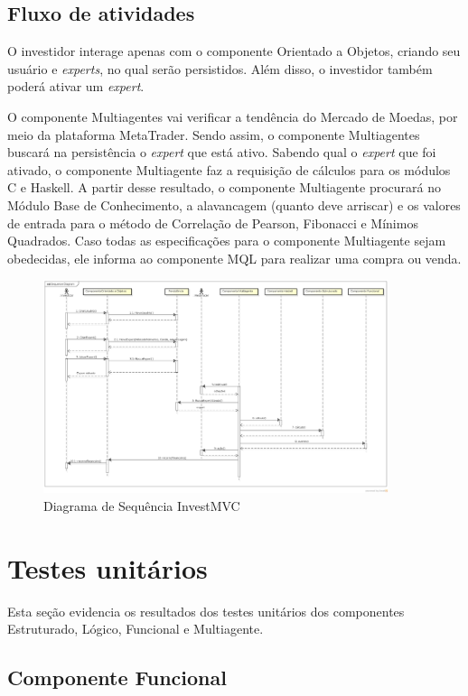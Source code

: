 \subsection{Fluxo de atividades}
O investidor interage apenas com o componente Orientado a Objetos, criando seu usuário e \textit{experts}, no qual serão persistidos. Além disso, o investidor também poderá ativar um \textit{expert}.

O componente Multiagentes vai verificar a tendência do Mercado de Moedas, por meio da plataforma MetaTrader. Sendo assim, o componente Multiagentes buscará na persistência o \textit{expert} que está ativo. Sabendo qual o \textit{expert} que foi ativado, o componente Multiagente faz a requisição de cálculos para os módulos C e Haskell. A partir desse resultado, o componente Multiagente procurará no Módulo Base de Conhecimento, a alavancagem (quanto deve arriscar) e os valores de entrada para o método de Correlação de Pearson, Fibonacci e Mínimos Quadrados. Caso todas as especificações para o componente Multiagente sejam obedecidas, ele informa ao componente MQL para realizar uma compra ou venda.

\begin{figure}[H]
\centering
\includegraphics[width=0.9\textwidth]{figuras/sequencia}
\caption{Diagrama de Sequência InvestMVC} 
\label{sequencia}
\end{figure}

\section{Testes unitários}
Esta seção evidencia os resultados dos testes unitários dos componentes Estruturado, Lógico, Funcional e Multiagente.
\subsection{Componente Funcional}

